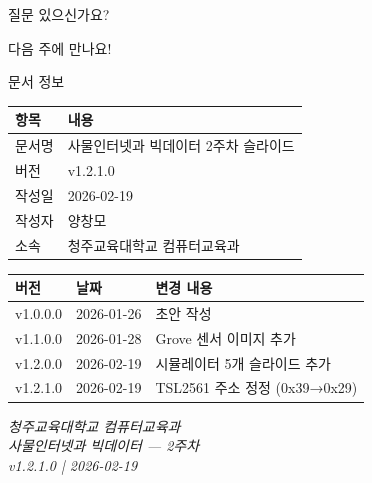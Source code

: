 \documentclass[aspectratio=169]{beamer}
\begin{document}
\begin{frame}{}
  \begin{center}
  \Huge
  질문 있으신가요?
  
  \vspace{2em}
  
  \normalsize
  다음 주에 만나요!
  \end{center}
\end{frame}


\begin{frame}{문서 정보}
  \begin{center}
    \begin{tabular}{l|l}
      \toprule
      \textbf{항목} & \textbf{내용} \\
      \midrule
      문서명 & 사물인터넷과 빅데이터 2주차 슬라이드 \\
      버전 & v1.2.1.0 \\
      작성일 & 2026-02-19 \\
      작성자 & 양창모 \\
      소속 & 청주교육대학교 컴퓨터교육과 \\
      \bottomrule
    \end{tabular}
  \end{center}
  
  \vspace{1em}
  
  \begin{center}
    \small
    \begin{tabular}{l|l|l}
      \toprule
      \textbf{버전} & \textbf{날짜} & \textbf{변경 내용} \\
      \midrule
      v1.0.0.0 & 2026-01-26 & 초안 작성 \\
      v1.1.0.0 & 2026-01-28 & Grove 센서 이미지 추가 \\
      v1.2.0.0 & 2026-02-19 & 시뮬레이터 5개 슬라이드 추가 \\
      v1.2.1.0 & 2026-02-19 & TSL2561 주소 정정 (0x39→0x29) \\
      \bottomrule
    \end{tabular}
  \end{center}
  
  \vspace{0.5em}
  
  \begin{center}
    \small
    \textit{청주교육대학교 컴퓨터교육과}\\
    \textit{사물인터넷과 빅데이터 --- 2주차}\\
    \textit{v1.2.1.0 | 2026-02-19}
  \end{center}
\end{frame}
\end{document}
